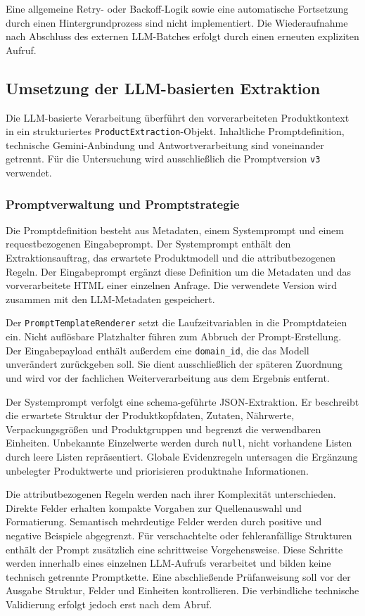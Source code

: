 Eine allgemeine Retry- oder Backoff-Logik sowie eine automatische Fortsetzung durch einen Hintergrundprozess sind nicht implementiert. Die Wiederaufnahme nach Abschluss 
des externen LLM-Batches erfolgt durch einen erneuten expliziten Aufruf.

\subsection{Umsetzung der LLM-basierten Extraktion}

Die LLM-basierte Verarbeitung überführt den vorverarbeiteten Produktkontext in ein strukturiertes \texttt{ProductExtraction}-Objekt. Inhaltliche Promptdefinition, 
technische Gemini-Anbindung und Antwortverarbeitung sind voneinander getrennt. Für die Untersuchung wird ausschließlich die Promptversion \texttt{v3} verwendet.

\subsubsection{Promptverwaltung und Promptstrategie}

Die Promptdefinition besteht aus Metadaten, einem Systemprompt und einem requestbezogenen Eingabeprompt. Der Systemprompt enthält den Extraktionsauftrag, das erwartete 
Produktmodell und die attributbezogenen Regeln. Der Eingabeprompt ergänzt diese Definition um die Metadaten und das vorverarbeitete HTML einer einzelnen Anfrage. Die 
verwendete Version wird zusammen mit den LLM-Metadaten gespeichert.

Der \texttt{PromptTemplateRenderer} setzt die Laufzeitvariablen in die Promptdateien ein. Nicht auflösbare Platzhalter führen zum Abbruch der Prompt-Erstellung. Der 
Eingabepayload enthält außerdem eine \texttt{domain\_id}, die das Modell unverändert zurückgeben soll. Sie dient ausschließlich der späteren Zuordnung und wird vor der 
fachlichen Weiterverarbeitung aus dem Ergebnis entfernt.

Der Systemprompt verfolgt eine schema-geführte JSON-Extraktion. Er beschreibt die erwartete Struktur der Produktkopfdaten, Zutaten, Nährwerte, Verpackungsgrößen und 
Produktgruppen und begrenzt die verwendbaren Einheiten. Unbekannte Einzelwerte werden durch \texttt{null}, nicht vorhandene Listen durch leere Listen repräsentiert. 
Globale Evidenzregeln untersagen die Ergänzung unbelegter Produktwerte und priorisieren produktnahe Informationen.

Die attributbezogenen Regeln werden nach ihrer Komplexität unterschieden. Direkte Felder erhalten kompakte Vorgaben zur Quellenauswahl und Formatierung. Semantisch 
mehrdeutige Felder werden durch positive und negative Beispiele abgegrenzt. Für verschachtelte oder fehleranfällige Strukturen enthält der Prompt zusätzlich eine 
schrittweise Vorgehensweise. Diese Schritte werden innerhalb eines einzelnen LLM-Aufrufs verarbeitet und bilden keine technisch getrennte Promptkette. Eine abschließende 
Prüfanweisung soll vor der Ausgabe Struktur, Felder und Einheiten kontrollieren. Die verbindliche technische Validierung erfolgt jedoch erst nach dem Abruf.

